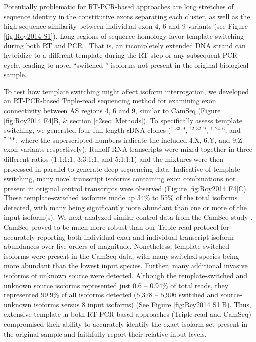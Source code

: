 {		Potentially problematic for RT-PCR-based approaches are long stretches of sequence identity in the constitutive exons separating each cluster, as well as the high sequence similarity between individual exon 4, 6 and 9 variants (see Figure \ref{fig:Roy2014 S1}). Long regions of sequence homology favor template switching during both RT and PCR \citep{Houseley2010a,Judo1998}. That is, an incompletely extended DNA strand can hybridize to a different template during the RT step or any subsequent PCR cycle, leading to novel ``switched '' isoforms not present in the original biological sample.

		To test how template switching might affect \dscam{} isoform interrogation, we developed an RT-PCR-based Triple-read sequencing method for examining exon connectivity between AS regions 4, 6 and 9, similar to CamSeq (Figure \ref{fig:Roy2014 F4}B, \& section \ref{c2sec: Methods}). To specifically assess template switching, we generated four full-length cDNA clones (\dscam{}$^{1,33,9}$, \dscam{}$^{12,32,9}$, \dscam{}$^{1,24,6}$, and \dscam$^{7,9,6}$; where the superscripted numbers indicate the included 4.X, 6.Y, and 9.Z exon variants respectively). Runoff RNA transcripts were mixed together in three different ratios (1:1:1:1, 3:3:1:1, and 5:1:1:1) and the mixtures were then processed in parallel to generate deep sequencing data. Indicative of template switching, many novel transcript isoforms containing exon combinations not present in original control transcripts were observed (Figure \ref{fig:Roy2014 F4}C). These template-switched isoforms made up 34\% to 55\% of the total isoforms detected, with many being significantly more abundant than one or more of the input isoform(s). We next analyzed similar control data from the CamSeq study \citep{Sun2013}. CamSeq proved to be much more robust than our Triple-read protocol for accurately reporting both individual exon and individual transcript isoform abundances over five orders of magnitude. Nonetheless, template-switched isoforms were present in the CamSeq data, with many switched species being more abundant than the lowest input species. Further, many additional invasive isoforms of unknown source were detected. Although the template-switched and unknown source isoforms represented just 0.6 – 0.94\% of total reads, they represented 99.9\% of all isoforms detected (5,378 – 5,906 switched and source-unknown isoforms versus 8 input isoforms) (See Figure \ref{fig:Roy2014 S1}B). Thus, extensive template in both RT-PCR-based approaches (Triple-read and CamSeq) compromised their ability to accurately identify the exact isoform set present in the original sample and faithfully report their relative input levels.

}
